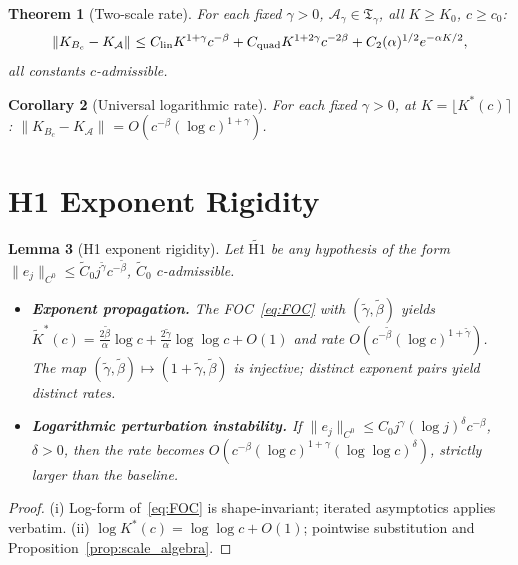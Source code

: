 \documentclass[12pt,a4paper]{amsart}
\newtheorem{theorem}{Theorem}[section]
\newtheorem{lemma}[theorem]{Lemma}
\newtheorem{corollary}[theorem]{Corollary}
\theoremstyle{definition}
\newcommand{\cA}{\mathcal{A}}
\newcommand{\cAg}{\mathcal{A}_\gamma}
\newcommand{\cK}{K_{B_c}}
\newcommand{\cKA}{K_{\cA}}
\newcommand{\normh}[2]{\|#1\|_{#2}}
\begin{document}
\begin{theorem}[Two-scale rate]
\label{thm:universal_rate}
For each fixed $\gamma>0$, $\cAg\in\mathfrak{T}_\gamma$,
all $K\geq K_0$, $c\geq c_0$:
\[
  \normh{\cK-\cKA}{}
  \leq C_{\rm lin}K^{1+\gamma}c^{-\beta}
  +C_{\rm quad}K^{1+2\gamma}c^{-2\beta}
  +C_2(\alpha)^{1/2}e^{-\alpha K/2},
\]
all constants $c$-admissible.
\end{theorem}

\begin{corollary}[Universal logarithmic rate]
\label{cor:universal_lograte}
For each fixed $\gamma>0$, at $K=\lfloor K^*(c)\rceil$:
$\normh{\cK-\cKA}{}=O(c^{-\beta}(\log c)^{1+\gamma})$.
\end{corollary}

\section{H1 Exponent Rigidity}
\label{sec:H1rigidity}

\begin{lemma}[H1 exponent rigidity]
\label{lem:H1_rigidity}
Let $\widetilde{\mathrm{H1}}$ be any hypothesis of the form
$\|e_j\|_{C^0} \leq \tilde C_0 j^{\tilde\gamma} c^{-\tilde\beta}$,
$\tilde C_0$ $c$-admissible.

\begin{itemize}[nosep]
  \item[\textup{(i)}] \textbf{Exponent propagation.}
    The FOC~\eqref{eq:FOC} with $(\tilde\gamma,\tilde\beta)$ yields
    $\widetilde K^*(c) = \frac{2\tilde\beta}{\alpha}\log c
    + \frac{2\tilde\gamma}{\alpha}\log\log c + O(1)$
    and rate $O(c^{-\tilde\beta}(\log c)^{1+\tilde\gamma})$.
    The map $(\tilde\gamma,\tilde\beta)\mapsto(1+\tilde\gamma,\tilde\beta)$
    is injective; distinct exponent pairs yield distinct rates.

  \item[\textup{(ii)}] \textbf{Logarithmic perturbation instability.}
    If $\|e_j\|_{C^0} \leq C_0 j^\gamma (\log j)^\delta c^{-\beta}$,
    $\delta>0$, then the rate becomes
    $O(c^{-\beta}(\log c)^{1+\gamma}(\log\log c)^\delta)$,
    strictly larger than the baseline.
\end{itemize}
\end{lemma}

\begin{proof}
(i) Log-form of~\eqref{eq:FOC} is shape-invariant;
iterated asymptotics applies verbatim.
(ii) $\log K^*(c) = \log\log c + O(1)$;
pointwise substitution and Proposition~\ref{prop:scale_algebra}.
\end{proof}
\end{document}
